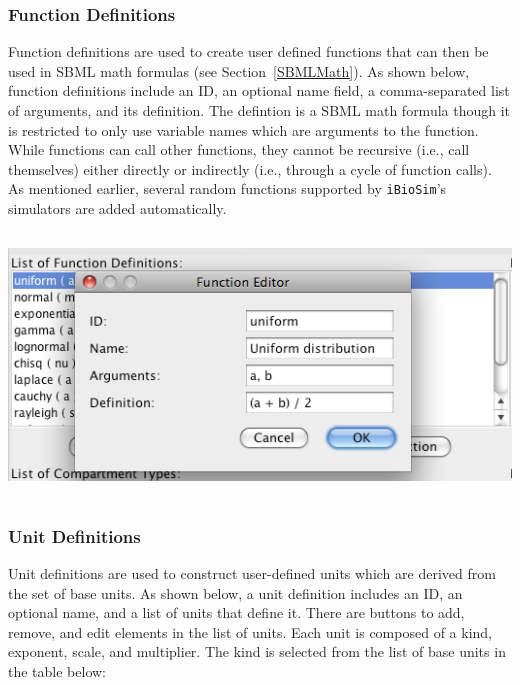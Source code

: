 \documentclass[titlepage,11pt]{article}
\begin{document}
\subsubsection{\label{funcDefn}Function Definitions}

\noindent
Function definitions are used to create user defined functions that
can then be used in SBML math formulas (see Section~\ref{SBMLMath}).  
As shown below, function definitions include an ID, an optional name field, a 
comma-separated list of arguments, and its definition.  The defintion 
is a SBML math formula though it is restricted to only use variable 
names which are arguments to the function.  While functions can
call other functions, they cannot be recursive (i.e., call themselves) 
either directly or indirectly (i.e., through a cycle of function calls).
As mentioned earlier, several random functions supported by 
{\tt iBioSim}'s simulators are added automatically.
\begin{center}
\includegraphics[height=70mm]{screenshots/function}
\end{center}

\subsubsection{\label{unitDefn}Unit Definitions}

\noindent
Unit definitions are used to construct user-defined units which are 
derived from the set of base units.  As shown below, a 
unit definition includes an ID, 
an optional name, and a list of units that define it.  There are
buttons to add, remove, and edit elements in the list of units.  
Each unit is composed of a kind, exponent, scale, and multiplier.  The kind 
is selected from the list of base units in the table below:
\end{document}
